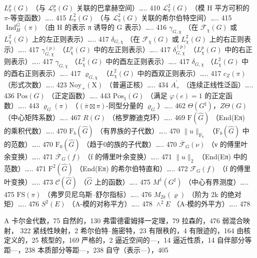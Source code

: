 \(L_{\pi}^{p}(G)\) （与 \(\mathcal{L}_{\pi}^{p}(G)\) 关联的巴拿赫空间）\ldots.. 410 \(\mathcal{L}_{\pi}^{2}(G)\) （模 H 平方可积的 \(\pi\)-等变函数）\ldots.. 415 \(L_{\pi}^{2}(G)\) （与 \(\mathcal{L}_{\pi}^{2}(G)\) 关联的希尔伯特空间）\ldots.. 415 \(\operatorname{Ind}_{H}^{G}(\pi)\) （由 H 的表示 π 诱导的 G 表示）\ldots.. 416 \(\gamma_{G,\chi}\) （在 \(\mathcal{F}_{\chi}(G)\) 或 \(L_{\chi}^{2}(G)\) 上的左正则表示）\ldots.. 417 \(\delta_{G,\chi}\) （在 \(\mathcal{F}_{\chi}(G)\) 或 \(L_{\chi}^{2}(G)\) 上的右正则表示）\ldots.. 417 \(\gamma_{G,\chi}^{(p)}\) （\(L_{\chi}^{p}(G)\) 中的左正则表示）\ldots.. 417 \(\delta_{G,\chi}^{(p)}\) （\(L_{\chi}^{p}(G)\) 中的右正则表示）\ldots.. 417 \(\gamma_{G,\chi}\) （\(L_{\chi}^{2}(G)\) 中的酉左正则表示）\ldots.. 417 \(\delta_{G,\chi}\) （\(L_{\chi}^{2}(G)\) 中的酉右正则表示）\ldots.. 417 \(\varrho_{G,\chi}\) （\(L_{\chi}^{2}(G)\) 中的酉双正则表示）\ldots.. 417 \(c_{Z}(\pi)\) （形式次数）\ldots.. 423 \(\mathrm{Noy}_{+}(\mathrm{X})\) （普遍正核）\ldots.. 434 \(A_{+}^{\prime}\) （连续正线性泛函）\ldots.. 436 \(\mathrm{Pos}(G)\) （正定函数）\ldots.. 443 \(\mathrm{Pos}_{1}(G)\) （满足 \(\varphi(e)=1\) 的正定函数）\ldots.. 443 \(\varrho_{G}(\pi)\) （\((\overline{\pi}\boxtimes\pi)\)-同型分量的 \(\varrho_{G}\)）\ldots.. 462 \(\Theta(G^{\sharp})\)，\(Z\Theta(G)\) （中心矩阵系数）\ldots.. 467 \(R(G)\) （格罗滕迪克环）\ldots.. 469 \(\mathrm{F}(\widehat{G})\) （End(Eπ) 的乘积代数）\ldots.. 470 \(\mathrm{F}_{b}(\widehat{G})\) （有界族的子代数）\ldots.. 470 \(\|u\|_{\mathrm{F}_{b}}\) （\(\mathrm{F}_{b}(\widehat{G})\) 中的范数）\ldots.. 470 \(\mathrm{F}_{0}(\widehat{G})\) （趋于0的族的子代数）\ldots.. 470 \(\overline{\mathcal{F}}_{G}(\nu)\) （ν 的傅里叶余变换）\ldots.. 471 \(\overline{\mathcal{F}}_{G}(f)\) （f 的傅里叶余变换）\ldots.. 471 \(\|u\|_{2}\) （End(Eπ) 中的范数）\ldots.. 471 \(\mathrm{F}^{2}(\widehat{G})\) （End(Eπ) 的希尔伯特直和）\ldots.. 472 \(\mathcal{F}_{G}(f)\) （f 的傅里叶变换）\ldots.. 473 \(\mathcal{C}(\widehat{G})\) （\(\widehat{G}\) 上的函数）\ldots.. 475 \(M^{1}(G^{\sharp})\) （中心有界测度）\ldots.. 475 \(\mathrm{FS}(\pi)\) （弗罗贝尼乌斯--舒尔指标）\ldots.. 476 \(M_{2k}(\varrho)\) （阶为 2k 的绝对矩）\ldots.. 476 \(S^{2}(E)\) （A-模的对称平方）\ldots.. 478 \(\wedge^{2}E\) （A-模的外平方）\ldots.. 478


A 卡尔金代数，75 自然的，130 弗雷德霍姆择一定理，79 拉森的，476 弱混合映射，
322
紧线性映射，2 希尔伯特--施密特，23 有限秩的，4 有限迹的，164 由核定义的，25 核型的，169 严格的，2 逼近空间的---，14 逼近性质，14 自伴部分等距---，238 本质部分等距---，238 自守（表示---），405

